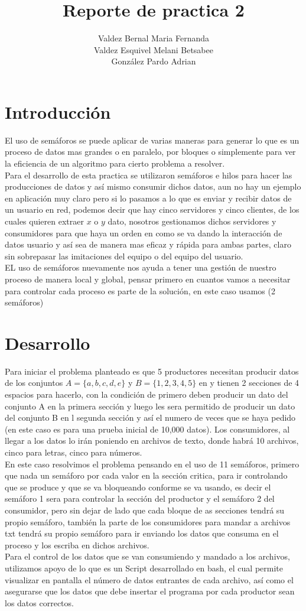 \documentclass[11pt,a4paper]{article}
\author{Valdez Bernal Maria Fernanda\\Valdez Esquivel Melani Betsabee\\
González Pardo Adrian}
\title{Reporte de practica 2}
\begin{document}
\maketitle
\section{Introducción}
El uso de semáforos se puede aplicar de varias maneras para
generar lo que es un proceso de datos mas grandes o en paralelo, por bloques o simplemente para ver la eficiencia de un algoritmo para cierto problema a resolver.\\
Para el desarrollo de esta practica se utilizaron semáforos e hilos para hacer las producciones de datos y así mismo consumir dichos datos, aun no hay un ejemplo en aplicación muy claro pero si lo pasamos a lo que es enviar y recibir datos de un usuario en red, podemos decir que hay cinco servidores y cinco clientes, de los cuales quieren extraer $x$ o $y$ dato, nosotros gestionamos dichos servidores y consumidores para que haya un orden en como se va dando la interacción de datos usuario y así sea de manera mas eficaz y rápida para ambas partes, claro sin sobrepasar las imitaciones del equipo o del equipo del usuario.\\
EL uso de semáforos nuevamente nos ayuda a tener una gestión de nuestro proceso de manera local y global, pensar primero en cuantos vamos a necesitar para controlar cada proceso es parte de la solución, en este caso usamos (2 semáforos)
\section{Desarrollo}

Para iniciar el problema planteado es que 5 productores necesitan producir datos de los conjuntos $A=\{a,b,c,d,e\}$ y $B=\{1,2,3,4,5\}$ en y tienen 2 secciones de 4 espacios para hacerlo, con la condición de primero deben producir un dato del conjunto A en la primera sección y luego les sera permitido de producir un dato del conjunto B en l segunda sección y así el numero de veces que se haya pedido (en este caso es para una prueba inicial de 10,000 datos). Los consumidores, al llegar a los datos lo irán poniendo en archivos de texto, donde habrá 10 archivos, cinco para letras, cinco para números.\\
En este caso resolvimos el problema pensando en el uso de 11 semáforos, primero que nada un semáforo por cada valor en la sección critica, para ir controlando que se produce y que se va bloqueando conforme se va usando, es decir el semáforo 1 sera para controlar la sección del productor y el semáforo 2 del consumidor, pero sin dejar de lado que cada bloque de as secciones tendrá su propio semáforo, también la parte de los consumidores para mandar a archivos txt tendrá su propio semáforo para ir enviando los datos que consuma en el proceso y los escriba en dichos archivos.\\
Para el control de los datos que se van consumiendo y mandado a los archivos, utilizamos apoyo de lo que es un Script desarrollado en bash, el cual permite visualizar en pantalla el número de datos entrantes de cada archivo, así como el asegurarse que los datos que debe insertar el programa por cada productor sean los datos correctos.
\end{document}
